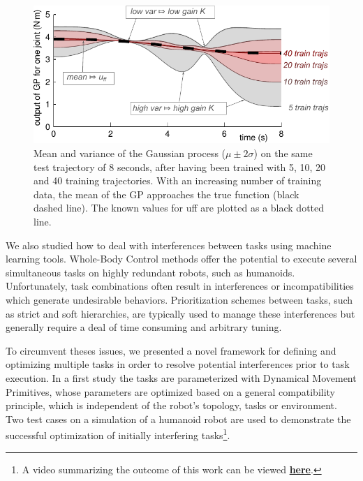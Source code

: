 \documentclass[final,5p,twocolumn]{elsarticle}
\begin{document}
\begin{figure}
  \centering
  \includegraphics[width=\linewidth]{images/meanvariance.pdf}
  \caption{Mean and variance of the Gaussian process ($\mu \pm 2\sigma$) on
    the same test trajectory of 8 seconds, after having been trained with 5,
    10, 20 and 40 training trajectories. With an increasing number of training
    data, the mean of the GP approaches the true function (black dashed
    line). The known values for uff are plotted as a black dotted line.}
  \label{fig:meanvariance}
\end{figure}

We also studied how to deal with interferences between tasks using
machine learning tools. Whole-Body Control methods offer the potential to
execute several simultaneous tasks on highly redundant robots, such as
humanoids. Unfortunately, task combinations often result in interferences or
incompatibilities which generate undesirable behaviors. Prioritization schemes
between tasks, such as strict and soft hierarchies, are typically used to manage
these interferences but generally require a deal of time consuming and arbitrary
tuning.

To circumvent theses issues, we presented a novel framework for defining and
optimizing multiple tasks in order to resolve potential interferences prior to
task execution. In a first study \cite{lober-HUMANOIDS2014} the tasks are
parameterized with Dynamical Movement Primitives, whose parameters are optimized
based on a general compatibility principle, which is independent of the robot's
topology, tasks or environment. Two test cases on a simulation of a humanoid
robot are used to demonstrate the successful optimization of initially interfering tasks\footnote{A video summarizing the outcome of this work can be viewed
\href{http://pages.isir.upmc.fr/~padois/website/fichiers/videos/lober_Humanoids2014.mp4}{\textbf{here}}.}.\\
\end{document}
